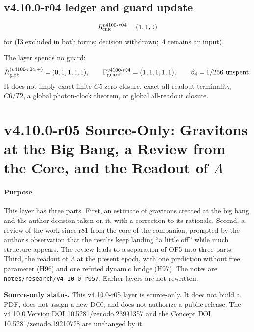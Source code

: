 \subsection*{v4.10.0-r04 ledger and guard update}
\label{subsec:v4100-r04-ledger-guard}

\[
R_{\rm chk}^{v4100\text{-}r04}=(1,1,0)
\]
for (I3 excluded in both forms; decision withdrawn; \(\Lambda\) remains an input).

The layer spends no guard:
\[
R_{\rm glob}^{(v4100\text{-}r04,+)}=(0,1,1,1,1),
\qquad
\Gamma_{\rm guard}^{v4100\text{-}r04}=(1,1,1,1,1),
\qquad
\beta_4=1/256\ \text{unspent}.
\]
It does not imply exact finite \(C5\) zero closure, exact all-readout terminality,
\(C6/T2\), a global photon-clock theorem, or global all-readout closure.

\clearpage
\section*{v4.10.0-r05 Source-Only: Gravitons at the Big Bang, a Review from the Core, and the Readout of \texorpdfstring{\(\Lambda\)}{Lambda}}
\label{sec:v4100-r05-core-review}

\paragraph{Purpose.}
This layer has three parts.  First, an estimate of gravitons created at the big bang and the author decision taken on it, with a correction to its
rationale.  Second, a review of the work since r81 from the core of the companion, prompted by the author's observation that the results keep
landing ``a little off'' while much structure appears.  The review leads to a separation of OP5 into three parts.  Third, the readout of \(\Lambda\)
at the present epoch, with one prediction without free parameter (H96) and one refuted dynamic bridge (H97).
The notes are \texttt{notes/\allowbreak research/\allowbreak v4\_10\_0\_r05/}.  Earlier layers are not rewritten.

\noindent\textbf{Source-only status.}
This v4.10.0-r05 layer is source-only.  It does not build a PDF, does not assign a new DOI,
and does not authorize a public release.  The v4.10.0 Version DOI
\href{https://doi.org/10.5281/zenodo.23991357}{10.5281/zenodo.23991357} and the Concept DOI
\href{https://doi.org/10.5281/zenodo.19210728}{10.5281/zenodo.19210728} are unchanged by it.

